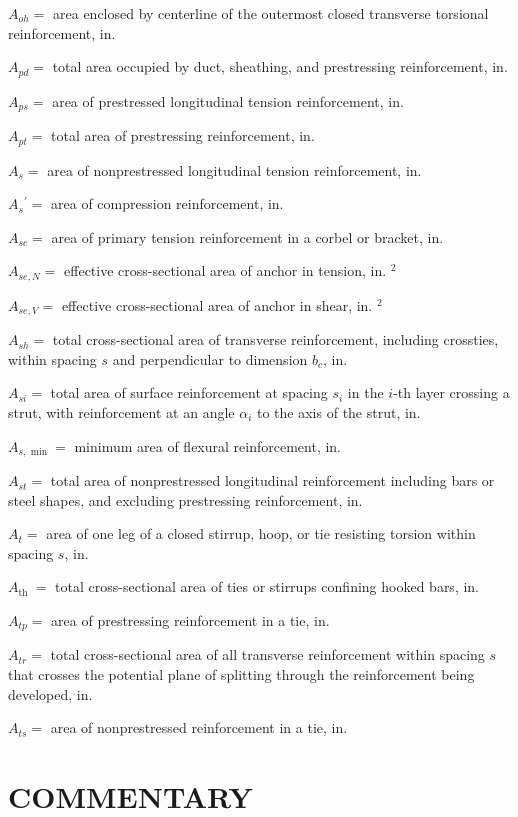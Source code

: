 \documentclass[10pt]{article}
\begin{document}
$A_{o h}=$ area enclosed by centerline of the outermost closed transverse torsional reinforcement, in.  

$A_{p d}=$ total area occupied by duct, sheathing, and prestressing reinforcement, in.  

$A_{p s}=$ area of prestressed longitudinal tension reinforcement, in.  

$A_{p t}=$ total area of prestressing reinforcement, in.  

$A_{s}=$ area of nonprestressed longitudinal tension reinforcement, in.  

$A_{s}{ }^{\prime}=$ area of compression reinforcement, in.  

$A_{s c}=$ area of primary tension reinforcement in a corbel or bracket, in.  

$A_{s e, N}=$ effective cross-sectional area of anchor in tension, in. $^{2}$

$A_{s e, V}=$ effective cross-sectional area of anchor in shear, in. $^{2}$

$A_{s h}=$ total cross-sectional area of transverse reinforcement, including crossties, within spacing $s$ and perpendicular to dimension $b_{c}$, in.  

$A_{s i}=$ total area of surface reinforcement at spacing $s_{i}$ in the $i$-th layer crossing a strut, with reinforcement at an angle $\alpha_{i}$ to the axis of the strut, in.  

$A_{s, \text { min }}=$ minimum area of flexural reinforcement, in.  

$A_{s t}=$ total area of nonprestressed longitudinal reinforcement including bars or steel shapes, and excluding prestressing reinforcement, in.  

$A_{t}=$ area of one leg of a closed stirrup, hoop, or tie resisting torsion within spacing $s$, in.  

$A_{\text {th }}=$ total cross-sectional area of ties or stirrups confining hooked bars, in.  

$A_{t p}=$ area of prestressing reinforcement in a tie, in.  

$A_{t r}=$ total cross-sectional area of all transverse reinforcement within spacing $s$ that crosses the potential plane of splitting through the reinforcement being developed, in.  

$A_{t s}=$ area of nonprestressed reinforcement in a tie, in.  

\section*{COMMENTARY}
\end{document}
